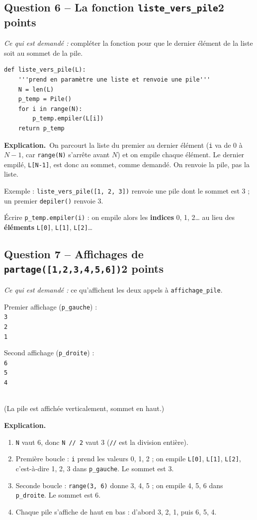 \documentclass[11pt, a4paper]{exam}
\newcommand{\code}[1]{\texttt{#1}}
\newcommand{\Qt}[2]{\subsection*{#1\hfill{\normalfont\small #2}}}
\newcommand{\rappel}[1]{\noindent\textit{Ce qui est demandé :} #1\par\smallskip}
\newcommand{\explication}{\noindent\textbf{Explication.}\ }
\begin{document}
\Qt{Question 6 -- La fonction \code{liste\_vers\_pile}}{2 points}
\rappel{compléter la fonction pour que le dernier élément de la liste soit au sommet de la pile.}
\begin{reponse}
\begin{lstlisting}
def liste_vers_pile(L):
    '''prend en paramètre une liste et renvoie une pile'''
    N = len(L)
    p_temp = Pile()
    for i in range(N):
        p_temp.empiler(L[i])
    return p_temp
\end{lstlisting}
\end{reponse}
\explication On parcourt la liste du premier au dernier élément (\code{i} va de 0 à $N-1$, car \code{range(N)} s'arrête avant $N$) et on empile chaque élément. Le dernier empilé, \code{L[N-1]}, est donc au sommet, comme demandé. On renvoie la pile, pas la liste.

Exemple : \code{liste\_vers\_pile([1, 2, 3])} renvoie une pile dont le sommet est 3 ; un premier \code{depiler()} renvoie 3.

\begin{erreur}
Écrire \code{p\_temp.empiler(i)} : on empile alors les \textbf{indices} 0, 1, 2… au lieu des \textbf{éléments} \code{L[0]}, \code{L[1]}, \code{L[2]}…
\end{erreur}

\Qt{Question 7 -- Affichages de \code{partage([1,2,3,4,5,6])}}{2 points}
\rappel{ce qu'affichent les deux appels à \code{affichage\_pile}.}
\begin{reponse}
\begin{minipage}[t]{0.45\linewidth}
Premier affichage (\code{p\_gauche}) :\\
\code{3}\\\code{2}\\\code{1}
\end{minipage}\hfill
\begin{minipage}[t]{0.45\linewidth}
Second affichage (\code{p\_droite}) :\\
\code{6}\\\code{5}\\\code{4}
\end{minipage}\\[0.4em]
(La pile est affichée verticalement, sommet en haut.)
\end{reponse}
\explication
\begin{enumerate}
\item \code{N} vaut 6, donc \code{N // 2} vaut 3 (\code{//} est la division entière).
\item Première boucle : \code{i} prend les valeurs 0, 1, 2 ; on empile \code{L[0]}, \code{L[1]}, \code{L[2]}, c'est-à-dire 1, 2, 3 dans \code{p\_gauche}. Le sommet est 3.
\item Seconde boucle : \code{range(3, 6)} donne 3, 4, 5 ; on empile 4, 5, 6 dans \code{p\_droite}. Le sommet est 6.
\item Chaque pile s'affiche de haut en bas : d'abord 3, 2, 1, puis 6, 5, 4.
\end{enumerate}
\end{document}
